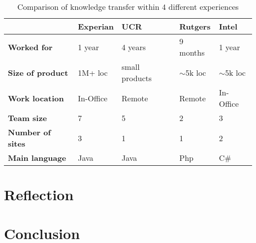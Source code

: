 \documentclass[12pt, letterpaper]{article}
\begin{document}
\begin{table}[] 
\centering
\caption{Comparison of knowledge transfer within 4 different experiences}
\label{comparisonTable}
\begin{tabular}{|l|l|l|l|l|}
\hline
                         & \textbf{Experian} & \textbf{UCR}   & \textbf{Rutgers} & \textbf{Intel} \\ \hline
\textbf{Worked for}      & 1 year            & 4 years        & 9 months         & 1 year         \\ \hline
\textbf{Size of product} & 1M+ loc           & small products & $\sim$5k loc     & $\sim$5k loc   \\ \hline
\textbf{Work location}   & In-Office         & Remote         & Remote           & In-Office      \\ \hline
\textbf{Team size}       & 7                 & 5              & 2                & 3              \\ \hline
\textbf{Number of sites} & 3                 & 1              & 1                & 2              \\ \hline
\textbf{Main language}   & Java              & Java           & Php              & C\#            \\ \hline
\end{tabular}
\end{table}

\section{Reflection}

\section{Conclusion}




 
\end{document}
